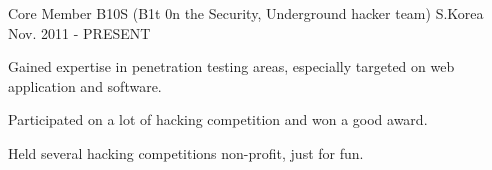 


\begin{cventries}


\cventry
{Core Member} %
{B10S (B1t 0n the Security, Underground hacker team)} %
{S.Korea} %
{Nov. 2011 - PRESENT} %
{ %
\begin{cvitems}
\item {Gained expertise in penetration testing areas, especially targeted on web application and software.}
\item {Participated on a lot of hacking competition and won a good award.}
\item {Held several hacking competitions non-profit, just for fun.}
\end{cvitems}
}



\end{cventries}